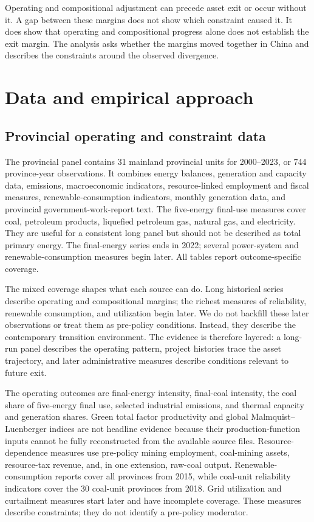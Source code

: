 \documentclass[11pt]{article}
\begin{document}
Operating and compositional adjustment can precede asset exit or occur without it. A gap between these margins does not show which constraint caused it. It does show that operating and compositional progress alone does not establish the exit margin. The analysis asks whether the margins moved together in China and describes the constraints around the observed divergence.

\section{Data and empirical approach}

\subsection{Provincial operating and constraint data}

The provincial panel contains 31 mainland provincial units for 2000--2023, or 744 province-year observations. It combines energy balances, generation and capacity data, emissions, macroeconomic indicators, resource-linked employment and fiscal measures, renewable-consumption indicators, monthly generation data, and provincial government-work-report text. The five-energy final-use measures cover coal, petroleum products, liquefied petroleum gas, natural gas, and electricity. They are useful for a consistent long panel but should not be described as total primary energy. The final-energy series ends in 2022; several power-system and renewable-consumption measures begin later. All tables report outcome-specific coverage.

The mixed coverage shapes what each source can do. Long historical series describe operating and compositional margins; the richest measures of reliability, renewable consumption, and utilization begin later. We do not backfill these later observations or treat them as pre-policy conditions. Instead, they describe the contemporary transition environment. The evidence is therefore layered: a long-run panel describes the operating pattern, project histories trace the asset trajectory, and later administrative measures describe conditions relevant to future exit.

The operating outcomes are final-energy intensity, final-coal intensity, the coal share of five-energy final use, selected industrial emissions, and thermal capacity and generation shares. Green total factor productivity and global Malmquist--Luenberger indices are not headline evidence because their production-function inputs cannot be fully reconstructed from the available source files. Resource-dependence measures use pre-policy mining employment, coal-mining assets, resource-tax revenue, and, in one extension, raw-coal output. Renewable-consumption reports cover all provinces from 2015, while coal-unit reliability indicators cover the 30 coal-unit provinces from 2018. Grid utilization and curtailment measures start later and have incomplete coverage. These measures describe constraints; they do not identify a pre-policy moderator.
\end{document}
